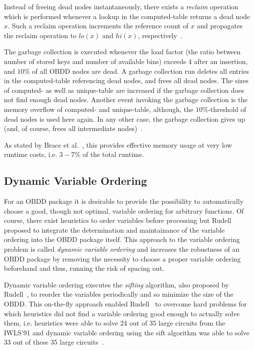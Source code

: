 \documentclass{vldb}
\begin{document}
Instead of freeing dead nodes instantaneously, there exists a \textit{reclaim}
operation which is performed whenever a lookup in the computed-table returns a
dead node $x$. Such a reclaim operation increments the reference count of $x$ and
propagates the reclaim operation to $lo(x)$ and $hi(x)$,
respectively~\cite{BRACE90}.

The garbage collection is executed whenever the load factor (the ratio between
number of stored keys and number of available bins) exceeds 4 after an insertion,
and $10\%$ of all OBDD nodes are dead. A garbage collection run deletes all entries
in the computed-table referencing dead nodes, and frees all dead nodes. The sizes
of computed- as well as unique-table are increased if the garbage collection does
not find enough dead nodes. Another event invoking the garbage collection is the
memory overflow of computed- and unique-table, although, the $10\%$-threshold of
dead nodes is used here again. In any other case, the garbage collection gives up (and,
of course, frees all intermediate nodes)~\cite{BRACE90}.

As stated by Brace et al.~\cite{BRACE90}, this provides effective memory usage
at very low runtime costs, i.e. $3-7\%$ of the total runtime.

\subsection{Dynamic Variable Ordering}
\label{subsec:dynamic-variable-ordering}

For an OBDD package it is desirable to provide the possibility to automatically 
choose a good, though not optimal, variable ordering for arbitrary functions. Of
course, there exist heuristics to order variables before processing but
Rudell~\cite{RUDELL93} proposed to integrate the determination and maintainance
of the variable ordering into the OBDD package itself. This approach to the variable
ordering problem is called \textit{dynamic variable ordering} and increases the
robustness of an OBDD package by removing the necessity to choose a proper 
variable ordering beforehand and thus, running the risk of spacing out.

Dynamic variable ordering executes the \textit{sifting} algorithm, also proposed
by Rudell~\cite{RUDELL93}, to reorder the variables periodically and so minimize
the size of the OBDD. This on-the-fly approach enabled Rudell~\cite{RUDELL93} to
overcome hard problems for which heuristics did not find a variable ordering good
enough to actually solve them, i.e. heuristics were able to solve 24 out of 35
large circuits from the IWLS'91 and dynamic variable ordering using the sift
algorithm was able to solve 33 out of these 35 large circuits~\cite{RUDELL93}.
\end{document}
